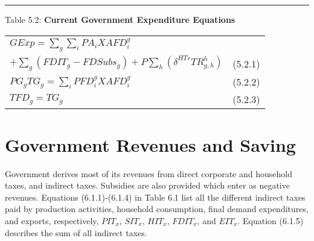 \documentclass[12pt]{article}
\begin{document}
\noindent\rule{\linewidth}{0.4pt}
\begin{center}
\begin{large}
{\centering Table 5.2: \textbf{Current Government Expenditure Equations} \par}

\begin{tabular}{>{\raggedright}p{} l}

$GExp = \displaystyle\sum_g\sum_iPA_iXAFD^g_i$\\
\hspace{31pt} $+ \displaystyle\sum_g \left(FDIT_g - FDSubs_g\right) + P\displaystyle\sum_h\left(\delta^{HTr}TR^h_{g, h}\right)$ & (5.2.1)\\[15pt]

$PG_gTG_g = \displaystyle\sum_iPFD^g_iX\!AFD^g_i$ & (5.2.2)\\[15pt]

$TFD_g = TG_g$ & (5.2.3)\\[20pt]


\hline
\end{tabular}
\end{large}
\end{center}

\newpage

\section{Government Revenues and Saving}

Government derives most of its revenues from direct corporate and household taxes, and indirect taxes. Subsidies are also provided which enter as negative revenues. Equations (6.1.1)-(6.1.4) in Table 6.1 list all the different indirect taxes paid by production activities, household consumption, final demand expenditures, and exports, respectively, $PIT_x$, $SIT_x$, $HIT_x$, $FDIT_x$, and $EIT_x$. Equation (6.1.5) describes the sum of all indirect taxes.
\end{document}
